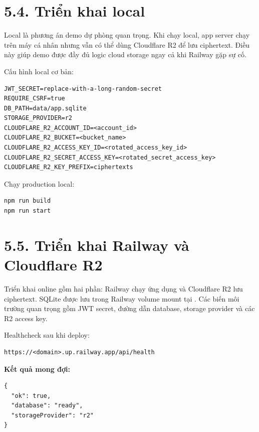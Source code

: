 \section*{5.4. Triển khai local}
{}

Local là phương án demo dự phòng quan trọng. Khi chạy local, app server chạy trên máy cá nhân nhưng vẫn có thể dùng Cloudflare R2 để lưu ciphertext. Điều này giúp demo được đầy đủ logic cloud storage ngay cả khi Railway gặp sự cố.

Cấu hình local cơ bản:

\begin{lstlisting}
JWT_SECRET=replace-with-a-long-random-secret
REQUIRE_CSRF=true
DB_PATH=data/app.sqlite
STORAGE_PROVIDER=r2
CLOUDFLARE_R2_ACCOUNT_ID=<account_id>
CLOUDFLARE_R2_BUCKET=<bucket_name>
CLOUDFLARE_R2_ACCESS_KEY_ID=<rotated_access_key_id>
CLOUDFLARE_R2_SECRET_ACCESS_KEY=<rotated_secret_access_key>
CLOUDFLARE_R2_KEY_PREFIX=ciphertexts
\end{lstlisting}

Chạy production local:

\begin{lstlisting}[language=bash]
npm run build
npm run start
\end{lstlisting}

\section*{5.5. Triển khai Railway và Cloudflare R2}
{}

Triển khai online gồm hai phần: Railway chạy ứng dụng và Cloudflare R2 lưu ciphertext. SQLite được lưu trong Railway volume mount tại . Các biến môi trường quan trọng gồm JWT secret, đường dẫn database, storage provider và các R2 access key.

Healthcheck sau khi deploy:

\begin{lstlisting}
https://<domain>.up.railway.app/api/health
\end{lstlisting}

\begin{minipage}{\linewidth}
\textbf{Kết quả mong đợi:}
\begin{lstlisting}
{
  "ok": true,
  "database": "ready",
  "storageProvider": "r2"
}
\end{lstlisting}
\end{minipage}


